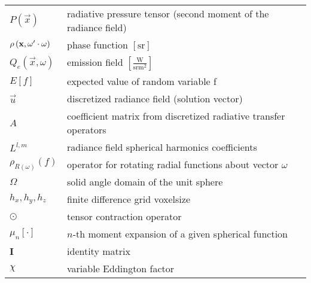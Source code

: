 \begin{flushleft}
\begin{longtable}[c]{@{}p{28.5mm}@{} p{120.5mm}}
	\\
	$P\left(\vec{x}\right)$	&  radiative pressure tensor (second moment of the radiance field)
	\\
	$\rho\left(\mathbf{x}, \omega'\cdot\omega\right)$	&  phase function $\left[\si{\steradian}\right]$
	\\
	$Q_e\left(\vec{x}, \omega\right)$	&  emission field $\left[\frac{\si{\watt}}{\si{\steradian} \si{\meter}^2}\right]$
	\\
	$E\left[f\right]$	&  expected value of random variable f
	\\
	$\vec{u}$	&  discretized radiance field (solution vector)
	\\
	$A$	&  coefficient matrix from discretized radiative transfer operators
	\\
	$L^{l,m}$	&  radiance field spherical harmonics coefficients
	\\
	$\rho_{R\left(\omega\right)}\left(f\right)$	&  operator for rotating radial functions about vector $\omega$
	\\
	$\Omega$	&  solid angle domain of the unit sphere
	\\
	$h_x, h_y, h_z$	&  finite difference grid voxelsize
	\\
	$\odot$	&  tensor contraction operator
	\\
	$\mu_n\left[\cdot\right]$	&  $n$-th moment expansion of a given spherical function
	\\
	$\mathbf{I}$	&  identity matrix
	\\
	$\chi$	&  variable Eddington factor
\end{longtable}
\end{flushleft}
%
%